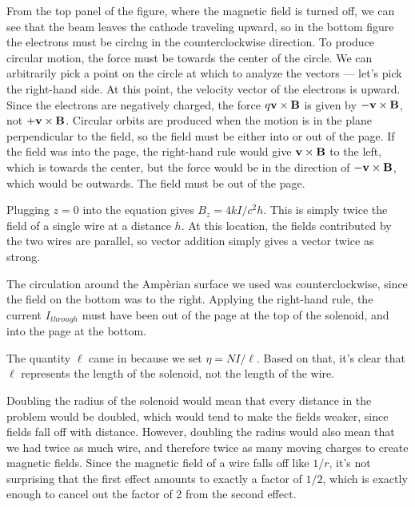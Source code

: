  From the top panel of the figure, where the
magnetic field is turned off, we can see that the beam leaves the cathode
traveling upward, so in the bottom figure the electrons must be circlng in the
counterclockwise direction. To produce circular motion, the
 force must be towards the center of the circle. We can arbitrarily pick
 a point on the circle at which to analyze the vectors --- let's pick the right-hand
 side. At this point, the velocity vector of the electrons is upward. Since the
 electrons are negatively charged, the force $q\textbf{v}\times\textbf{B}$ is given by
 $-\textbf{v}\times\textbf{B}$, not  $+\textbf{v}\times\textbf{B}$. Circular orbits are
 produced when the motion is in the plane perpendicular to the field,
 so the field must be either into or out of the page. If the field was into the
 page, the right-hand rule would give $\textbf{v}\times\textbf{B}$ to the left, which is
 towards the center, but the force would be in the direction of
 $-\textbf{v}\times\textbf{B}$, which would be outwards. The field must be out of the page. 
 
 Plugging $z=0$ into the equation gives
$B_z=4kI/c^2h$. This is simply twice the field of
a single wire at a distance $h$. At this location, the fields contributed
by the two wires are parallel, so vector addition simply gives a vector twice as
strong.

 The circulation around the Amp\`{e}rian surface we used
was counterclockwise, since the field on the bottom was to the right. Applying the
right-hand rule, the current $I_{through}$ must have been out of the page at the
top of the solenoid, and into the page at the bottom.

 The quantity $\ell$ came in because we set $\eta=NI/\ell$.
 Based on that, it's clear that $\ell$ represents the length of the solenoid, not the
 length of the wire.

 Doubling the radius of the solenoid would mean that every
 distance in the problem would be doubled, which would tend to make the fields weaker,
 since fields fall off with distance. However, doubling the radius would also mean that
 we had twice as much wire, and therefore twice as many moving charges to create magnetic
 fields. Since the magnetic field of a wire falls off like $1/r$, it's not surprising that
 the first effect amounts to exactly a factor of $1/2$, which is exactly enough to cancel
 out the factor of 2 from the second effect.

